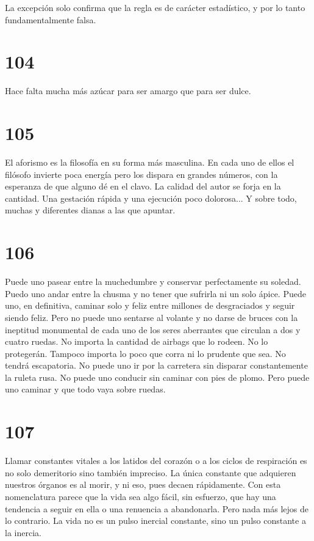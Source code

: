 \documentclass[a4paper,11pt,openright,twocolumn]{book}
\begin{document}
La excepción solo confirma que la regla es de carácter estadístico, y por lo tanto fundamentalmente falsa.

\section*{104}

Hace falta mucha más azúcar para ser amargo que para ser dulce.

\section*{105}

El aforismo es la filosofía en su forma más masculina. En cada uno de ellos el filósofo invierte poca
energía pero los dispara en grandes números, con la esperanza de que alguno dé en el clavo. La calidad
del autor se forja en la cantidad. Una gestación rápida y una ejecución poco
dolorosa... Y sobre todo, muchas y diferentes dianas a las que apuntar.

\section*{106}

Puede uno pasear entre la muchedumbre y conservar perfectamente su soledad. Puedo uno andar entre la 
chusma y no tener que sufrirla ni un solo ápice. Puede uno, en definitiva, caminar solo y feliz entre
millones de desgraciados y seguir siendo feliz. Pero no puede uno sentarse al volante y no darse de bruces
con la ineptitud
monumental de cada uno de los seres aberrantes que circulan a dos y cuatro ruedas. No importa la cantidad 
de airbags que lo rodeen. No lo protegerán. Tampoco importa
lo poco que corra ni lo prudente que sea. No tendrá escapatoria. No puede uno ir por la carretera
sin disparar constantemente la ruleta rusa. No puede uno conducir sin caminar con pies de plomo. 
Pero puede uno caminar y que todo vaya sobre ruedas.

\section*{107}

Llamar constantes vitales a los latidos del corazón o a los ciclos de respiración es no solo
demeritorio sino también impreciso. La única constante que adquieren nuestros órganos es al morir,
y ni eso, pues decaen rápidamente. Con esta nomenclatura parece que la vida sea algo fácil, sin
esfuerzo, que hay una tendencia a seguir en ella o una renuencia a abandonarla.
Pero nada más lejos de lo contrario. La vida no es un pulso
inercial constante, sino un pulso constante a la inercia.
\end{document}
